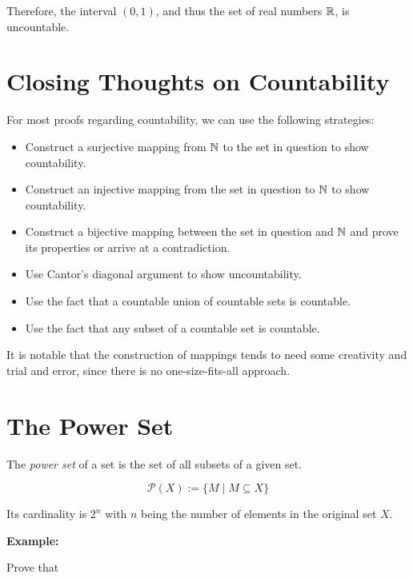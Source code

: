 Therefore, the interval \( (0,1) \), and thus the set of real numbers \( \mathbb{R} \), is uncountable.

\QED

\section{Closing Thoughts on Countability}

For most proofs regarding countability, we can use the following strategies:

\begin{itemize}

	\item Construct a surjective mapping from \( \mathbb{N} \) to the set in question to show countability.

	\item Construct an injective mapping from the set in question to \( \mathbb{N} \) to show countability.

	\item Construct a bijective mapping between the set in question and \( \mathbb{N} \) and prove its properties or arrive at a contradiction.

	\item Use Cantor's diagonal argument to show uncountability.

	\item Use the fact that a countable union of countable sets is countable.

	\item Use the fact that any subset of a countable set is countable.

\end{itemize}

It is notable that the construction of mappings tends to need some creativity and trial and error, since there
is no one-size-fits-all approach.

\section{The Power Set}

The \emph{power set} of a set is the set of all subsets of a given set.

\[
	\mathcal{P}(X):= \{ M \mid M \subseteq X\}
\]

Its cardinality is \(2^n\) with \(n\) being the number of elements in the original set \(X\).

\textbf{Example:}

Prove that

